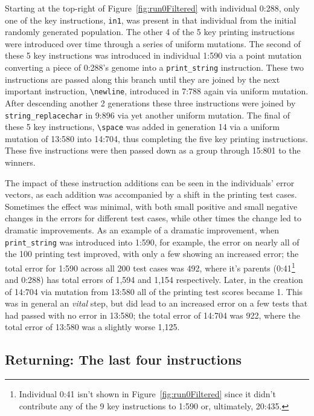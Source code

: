 \documentclass[graybox]{svmult}
\begin{document}
Starting at the top-right of Figure~\ref{fig:run0Filtered} with individual 0:288, only
one of the key instructions, \texttt{in1}, was present in that individual from 
the initial randomly generated population. The other 4 of the 5 key printing 
instructions were introduced over time
through a series of uniform mutations. The second of these 5 key instructions was introduced in individual 1:590 via a point
mutation converting a piece of 0:288's genome into a \texttt{print\_string} instruction. These two
instructions are passed along this branch until they are joined by the next important instruction,
\texttt{\textbackslash newline}, introduced in 7:788 again via uniform
mutation.
After descending another 2 generations these three instructions were joined by \texttt{string\_replacechar}
in 9:896 via yet another uniform mutation. 
The final of these 5 key instructions, \texttt{\textbackslash space} was
added in generation 14 via a uniform mutation of 13:580 into 14:704, thus completing the five key printing
instructions. These five instructions were then passed down as a group through 15:801 to the winners.

The impact of these instruction additions can be seen in the individuals'
error vectors, as each addition
was accompanied by a shift in the printing test cases. Sometimes the effect was 
minimal, with both small positive and small negative changes
in the errors for different test cases, while other times the change led to 
dramatic improvements. As an example of a dramatic improvement, when
\texttt{print\_string} was introduced into 1:590, for example, the error on 
nearly all of the 100 printing test improved, with only a few showing an 
increased error; the total error for 1:590 across all 200 test cases was 
492, where it's parents (0:41\footnote{Individual 0:41 isn't shown in 
	Figure~\ref{fig:run0Filtered} since it didn't contribute any of the 9 key 
	instructions to 1:590 or, ultimately, 20:435.} and 0:288) has total errors 
of 1,594 and 1,154 respectively.
Later, in the creation of 14:704 via mutation from 13:580 all of the 
printing test scores became 1. This was in general an \emph{vital} step, 
but did lead to an increased error on a few tests that had passed with no 
error in 13:580; the total error of 14:704 was 922, where the 
total error of 13:580 was a slightly worse 1,125.

\subsection{Returning: The last four instructions}
\label{sec:Returning}
\end{document}
